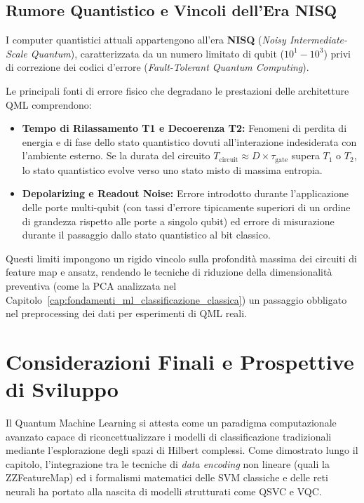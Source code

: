 \subsection{Rumore Quantistico e Vincoli dell'Era NISQ}
I computer quantistici attuali appartengono all'era \textbf{NISQ} (\textit{Noisy Intermediate-Scale Quantum}), caratterizzata da un numero limitato di qubit ($10^1 - 10^3$) privi di correzione dei codici d'errore (\textit{Fault-Tolerant Quantum Computing}).

Le principali fonti di errore fisico che degradano le prestazioni delle architetture QML comprendono:
\begin{itemize}
    \item \textbf{Tempo di Rilassamento T1 e Decoerenza T2:} Fenomeni di perdita di energia e di fase dello stato quantistico dovuti all'interazione indesiderata con l'ambiente esterno. Se la durata del circuito $T_{\text{circuit}} \approx D \times \tau_{\text{gate}}$ supera $T_1$ o $T_2$, lo stato quantistico evolve verso uno stato misto di massima entropia.
    \item \textbf{Depolarizing e Readout Noise:} Errore introdotto durante l'applicazione delle porte multi-qubit (con tassi d'errore tipicamente superiori di un ordine di grandezza rispetto alle porte a singolo qubit) ed errore di misurazione durante il passaggio dallo stato quantistico al bit classico.
\end{itemize}

Questi limiti impongono un rigido vincolo sulla profondità massima dei circuiti di feature map e ansatz, rendendo le tecniche di riduzione della dimensionalità preventiva (come la PCA analizzata nel Capitolo~\ref{cap:fondamenti_ml_classificazione_classica}) un passaggio obbligato nel preprocessing dei dati per esperimenti di QML reali.

\section{Considerazioni Finali e Prospettive di Sviluppo}

Il Quantum Machine Learning si attesta come un paradigma computazionale avanzato capace di riconcettualizzare i modelli di classificazione tradizionali mediante l'esplorazione degli spazi di Hilbert complessi. Come dimostrato lungo il capitolo, l'integrazione tra le tecniche di \textit{data encoding} non lineare (quali la ZZFeatureMap) ed i formalismi matematici delle SVM classiche e delle reti neurali ha portato alla nascita di modelli strutturati come QSVC e VQC.

